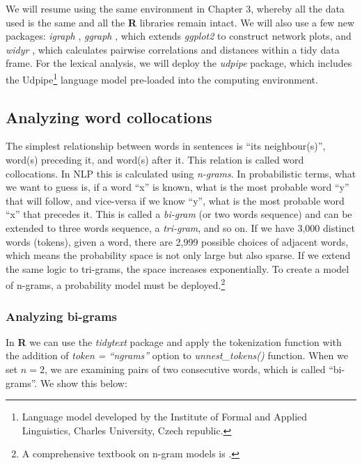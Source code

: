 \documentclass[
]{article}
\begin{document}
We will resume using the same environment in Chapter 3, whereby all the data used is the same and all the \textbf{R} libraries remain intact. We will also use a few new packages: \emph{igraph} \citep{igraph}, \emph{ggraph} \citep{ggraph}, which extends \emph{ggplot2} to construct network plots, and \emph{widyr} \citep{widyr}, which calculates pairwise correlations and distances within a tidy data frame. For the lexical analysis, we will deploy the \emph{udpipe} \citep{udpipe} package, which includes the Udpipe\footnote{Language model developed by the Institute of Formal and Applied Linguistics, Charles University, Czech republic.} language model pre-loaded into the computing environment.

\hypertarget{analyzing-word-collocations}{%
\subsection{Analyzing word collocations}\label{analyzing-word-collocations}}

The simplest relationship between words in sentences is ``its neighbour(s)'', word(s) preceding it, and word(s) after it. This relation is called word collocations. In NLP this is calculated using \emph{n-grams}. In probabilistic terms, what we want to guess is, if a word ``x'' is known, what is the most probable word ``y'' that will follow, and vice-versa if we know ``y'', what is the most probable word ``x'' that precedes it. This is called a \emph{bi-gram} (or two words sequence) and can be extended to three words sequence, a \emph{tri-gram}, and so on. If we have 3,000 distinct words (tokens), given a word, there are 2,999 possible choices of adjacent words, which means the probability space is not only large but also sparse. If we extend the same logic to tri-grams, the space increases exponentially. To create a model of n-grams, a probability model must be deployed.\footnote{A comprehensive textbook on n-gram models is \citep{manning1999}.}

\hypertarget{analyzing-bi-grams}{%
\subsubsection{Analyzing bi-grams}\label{analyzing-bi-grams}}

In \textbf{R} we can use the \emph{tidytext} package and apply the tokenization function with the addition of \emph{token = ``ngrams''} option to \emph{unnest\_tokens()} function. When we set \(n = 2\), we are examining pairs of two consecutive words, which is called ``bi-grams''. We show this below:
\end{document}
